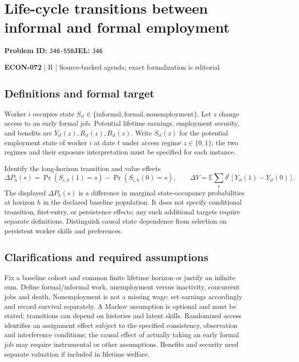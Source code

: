\documentclass[11pt,a4paper]{article}
\begin{document}
\section*{Life-cycle transitions between informal and formal employment}
\textbf{Problem ID:} \texttt{J46-550}\quad \textbf{JEL:} \texttt{J46}\par
\label{problem:OP-0639}


\label{audited:ECON-072}

{\sffamily\small\color{muted}\textbf{ECON-072} | R | Source-backed agenda; exact formalization is editorial\par}

\subsection*{Definitions and formal target}

Worker $i$ occupies state $S_{it}\in\{\text{informal},\text{formal},\text{nonemployment}\}$. Let $z$ change access to an early formal job. Potential lifetime earnings, employment security, and benefits are $Y_{it}(z),R_{it}(z),B_{it}(z)$. Write $S_{it}(z)$ for the potential employment state of worker $i$ at date $t$ under access regime $z\in\{0,1\}$; the two regimes and their exposure interpretation must be specified for each instance.

Identify the long-horizon transition and value effects
\[
 \Delta P_h(s)=\Pr(S_{i,h}(1)=s)-\Pr(S_{i,h}(0)=s),\qquad
 \Delta V=\mathbb E\sum_t\delta^t[Y_{it}(1)-Y_{it}(0)].
\]
The displayed $\Delta P_h(s)$ is a difference in marginal state-occupancy probabilities at horizon $h$ in the declared baseline population. It does not specify conditional transition, first-entry, or persistence effects; any such additional targets require separate definitions.
Distinguish causal state dependence from selection on persistent worker skills and preferences.

\subsection*{Clarifications and required assumptions}

Fix a baseline cohort and common finite lifetime horizon or justify an infinite sum. Define formal/informal work, unemployment versus inactivity, concurrent jobs and death. Nonemployment is not a missing wage: set earnings accordingly and record survival separately. A Markov assumption is optional and must be stated; transitions can depend on histories and latent skills. Randomized access identifies an assignment effect subject to the specified consistency, observation and interference conditions; the causal effect of actually taking an early formal job may require instrumental or other assumptions. Benefits and security need separate valuation if included in lifetime welfare.
\end{document}
